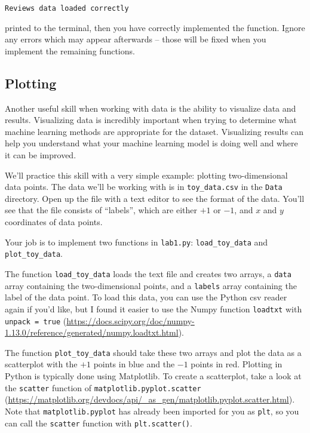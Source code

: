 \documentclass{article}
\begin{document}
\vspace{2mm}
\texttt{Reviews data loaded correctly}
\vspace{2mm}

\noindent
printed to the terminal, then you have correctly implemented the function. Ignore any errors which may appear afterwards -- those will be fixed when you implement the remaining functions.

\subsection{Plotting}

Another useful skill when working with data is the ability to visualize data and results. Visualizing data is incredibly important when trying to determine what machine learning methods are appropriate for the dataset. Visualizing results can help you understand what your machine learning model is doing well and where it can be improved.

We'll practice this skill with a very simple example: plotting two-dimensional data points. The data we'll be working with is in \texttt{toy\_data.csv} in the \texttt{Data} directory. Open up the file with a text editor to see the format of the data. You'll see that the file consists of ``labels'', which are either $+1$ or $-1$, and $x$ and $y$ coordinates of data points.

 Your job is to implement two functions in \texttt{lab1.py}: \texttt{load\_toy\_data} and \texttt{plot\_toy\_data}.

 The function \texttt{load\_toy\_data} loads the text file and creates two arrays, a \texttt{data} array containing the two-dimensional points, and a \texttt{labels} array containing the label of the data point. To load this data, you can use the Python csv reader again if you'd like, but I found it easier to use the Numpy function \texttt{loadtxt} with \texttt{unpack = true} (\url{https://docs.scipy.org/doc/numpy-1.13.0/reference/generated/numpy.loadtxt.html}).

 The function \texttt{plot\_toy\_data} should take these two arrays and plot the data as a scatterplot with the $+1$ points in blue and the $-1$ points in red. Plotting in Python is typically done using Matplotlib. To create a scatterplot, take a look at the \texttt{scatter} function of \texttt{matplotlib.pyplot.scatter} (\url{https://matplotlib.org/devdocs/api/_as_gen/matplotlib.pyplot.scatter.html}). Note that \texttt{matplotlib.pyplot} has already been imported for you as \texttt{plt}, so you can call the \texttt{scatter} function with \texttt{plt.scatter()}.
\end{document}
